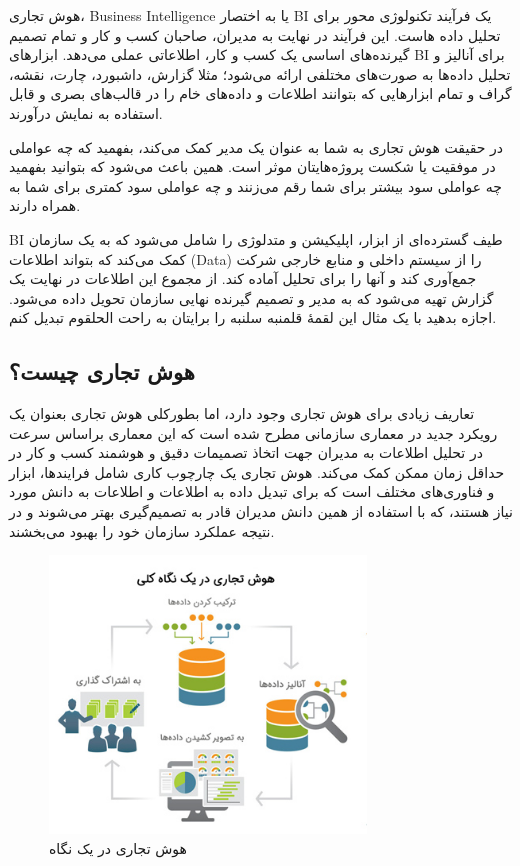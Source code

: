 \documentclass{llncs}
\begin{document}
هوش تجاری، Business Intelligence یا به اختصار BI یک فرآیند تکنولوژی محور برای تحلیل داده هاست. این فرآیند در نهایت به مدیران، صاحبان کسب و کار و تمام تصمیم گیرنده‌های اساسی یک کسب و کار، اطلاعاتی عملی می‌دهد. ابزارهای BI برای آنالیز و تحلیل داده‌ها به صورت‌های مختلفی ارائه می‌شود؛ مثلا گزارش، داشبورد، چارت، نقشه، گراف و تمام ابزارهایی که بتوانند اطلاعات و داده‌های خام را در قالب‌های بصری و قابل استفاده به نمایش درآورند.

در حقیقت هوش تجاری به شما به عنوان یک مدیر کمک می‌کند، بفهمید که چه عواملی در موفقیت یا شکست پروژه‌هایتان موثر است. همین باعث می‌شود که بتوانید بفهمید چه عواملی سود بیشتر برای شما رقم می‌زنند و چه عواملی سود کمتری برای شما به همراه دارند.

BI طیف گسترده‌ای از ابزار، اپلیکیشن‌ و متدلوژی را شامل می‌شود که به یک سازمان کمک می‌کند که بتواند اطلاعات (Data) را از سیستم داخلی و منابع خارجی شرکت جمع‌آوری کند و آنها را برای تحلیل آماده کند. از مجموع این اطلاعات در نهایت یک گزارش تهیه می‌شود که به مدیر و تصمیم گیرنده نهایی سازمان تحویل داده می‌شود. اجازه بدهید با یک مثال این لقمۀ قلمنبه سلنبه را برایتان به راحت الحلقوم تبدیل کنم.


\subsection{هوش تجاری چیست؟}
تعاریف زیادی برای هوش تجاری وجود دارد، اما بطورکلی هوش تجاری بعنوان یک رویکرد جدید در معماری سازمانی مطرح شده است که این معماری براساس سرعت در تحلیل اطلاعات به مدیران جهت اتخاذ تصمیمات دقیق و هوشمند کسب و کار در حداقل زمان ممکن کمک می‌کند. هوش تجاری یک چارچوب کاری شامل فرایندها، ابزار و فناوری‌های مختلف است که برای تبدیل داده به اطلاعات و اطلاعات به دانش مورد نیاز هستند، که با استفاده از همین دانش مدیران قادر به تصمیم‌گیری بهتر می‌شوند و در نتیجه عملکرد سازمان خود را بهبود می‌بخشند.

\begin{figure}
\centering
\includegraphics[width=0.75\textwidth]{mahi/bi-1.jpg}
\centering
\caption{هوش تجاری در یک نگاه}
\label{fig:bi-1}
\end{figure}
\end{document}
